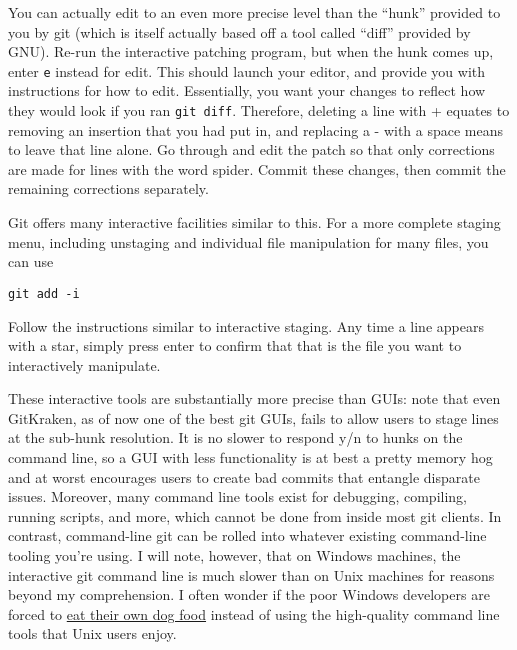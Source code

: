 {\par{
You can actually edit to an even more precise level than the ``hunk'' provided
to you by git (which is itself actually based off a tool called ``diff''
provided by GNU}). Re-run the interactive patching program, but when the hunk
comes up, enter \verb+e+ instead for edit. This should launch your editor, and
provide you with instructions for how to edit. Essentially, you want your
changes to reflect how they would look if you ran \verb+git diff+. Therefore,
deleting a line with + equates to removing an insertion that you had put in,
and replacing a - with a space means to leave that line alone. 
Go through and edit the patch
so that only corrections are made for lines with the word spider.
Commit these changes, then commit the remaining corrections separately.
}

\par{
Git offers many interactive facilities similar to this. For a more complete
staging menu, including unstaging and individual file manipulation for many
files, you can use
}

\begin{verbatim}
git add -i
\end{verbatim}

\par{
Follow the instructions similar to interactive staging. Any time a line
appears with a star, simply press enter to confirm that that is the file you
want to interactively manipulate.
}

\par{
These interactive tools are substantially
more precise than GUIs: note that even GitKraken, as of now one of the best
git GUIs, fails to allow users to stage lines at the sub-hunk resolution.
It is no slower to respond y/n to hunks on the command line, so a GUI with
less functionality is at best a pretty memory hog and at worst encourages
users to create bad commits that entangle disparate issues. 
Moreover, many command line tools exist for debugging, compiling, running
scripts, and more, which cannot be done from inside most git clients. In
contrast, command-line git can be rolled into whatever existing command-line
tooling you're using. I will note, however, that on Windows machines, the
interactive git command line is much slower than on Unix machines for reasons
beyond my comprehension. I often wonder if the poor Windows developers
are forced to 
\href{https://en.wikipedia.org/wiki/Eating_your_own_dog_food}{eat their own dog food}
instead of using the high-quality command line tools that Unix users enjoy. 
}
